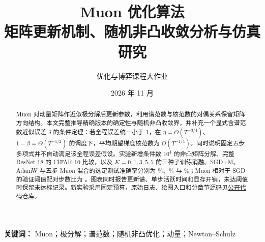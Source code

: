 \documentclass[11pt,a4paper,fontset=fandol]{ctexart}
\title{\vspace{-1.2em}\bfseries Muon 优化算法\\[0.25em]\Large 矩阵更新机制、随机非凸收敛分析与仿真研究}
\author{优化与博弈课程大作业}
\date{2026 年 11 月}
\theoremstyle{remark}
\begin{document}
\maketitle
\thispagestyle{empty}
\begin{abstract}
Muon 对动量矩阵作近似极分解后更新参数，利用谱范数与核范数的对偶关系保留矩阵方向结构。本文完整推导精确版本的确定性与随机非凸收敛界，并补充一个显式含谱范数近似误差 $\delta$ 的条件定理：若全程误差统一小于 1，在 $\eta=\Theta(T^{-3/4})$、$1-\beta=\Theta(T^{-1/2})$ 的调度下，平均期望梯度核范数为 $O(T^{-1/4})$。同时说明固定五步多项式并不自动满足该全程误差假设。实验新增条件数 $10^4$ 的非凸矩阵分解、完整 ResNet-18 的 CIFAR-10 比较，以及 $K=0,1,3,5,7$ 的三种子训练消融。SGD+M、AdamW 与五步 Muon 混合的选定测试准确率分别为 \CifarSGDAcc\%、\CifarAdamAcc\% 与 \CifarMuonAcc\%；Muon 相对于 SGD 的验证阈值配对步数比为 \CifarMuonSpeed。图表同时报告更新谱、单步活跃时间和显存开销，未达阈值时保留未达标记录。新实验采用固定预算，原始日志、绘图入口和分章节源码见\href{https://github.com/TrueEway/muon-course-project/tree/v1.1}{公开代码仓库}。
\end{abstract}
\noindent\textbf{关键词：} Muon；极分解；谱范数；随机非凸优化；动量；Newton--Schulz







\clearpage


\clearpage
\appendix


\end{document}
